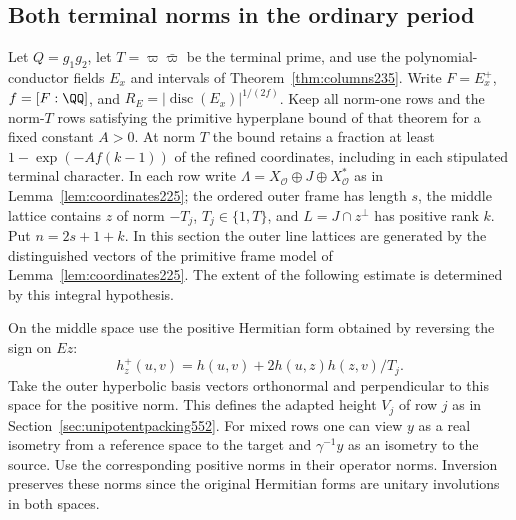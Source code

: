 \documentclass[a4paper,11pt]{article}
\theoremstyle{definition}
\theoremstyle{remark}
\numberwithin{equation}{section}
\begin{document}
\subsection{Both terminal norms in the ordinary period}
\label{sec:bothordinary553}

Let \(Q=g_1g_2\), let \(T=\varpi\bar\varpi\) be the terminal
prime, and use the polynomial-conductor fields \(E_x\) and
intervals of Theorem~\ref{thm:columns235}. Write \(F=E_x^+\),
\(f=[F:\QQ]\), and \(R_E=|\operatorname{disc}(E_x)|^{1/(2f)}\).
Keep all norm-one rows and the norm-\(T\) rows satisfying the
primitive hyperplane bound of that theorem for a fixed
constant \(A>0\). At norm \(T\) the bound retains a fraction
at least \(1-\exp(-Af(k-1))\) of the refined coordinates,
including in each stipulated terminal character. In each row
write \(\Lambda=X_{\mathcal O}\oplus J\oplus X_{\mathcal O}^*\)
as in Lemma~\ref{lem:coordinates225}; the ordered outer frame
has length \(s\), the middle lattice contains \(z\) of norm
\(-T_j\), \(T_j\in\{1,T\}\), and \(L=J\cap z^\perp\) has
positive rank \(k\). Put \(n=2s+1+k\). In this section the
outer line lattices are generated by the distinguished vectors
of the primitive frame model of Lemma~\ref{lem:coordinates225}.
The extent of the following estimate is determined by this
integral hypothesis.

On the middle space use the positive Hermitian form obtained by
reversing the sign on \(Ez\):
\[
        h_z^+(u,v)=h(u,v)+2h(u,z)h(z,v)/T_j .
\]
Take the outer hyperbolic basis vectors orthonormal and perpendicular
to this space for the positive norm. This defines the adapted
height \(V_j\) of row \(j\) as in Section~\ref{sec:unipotentpacking552}.
For mixed rows one can view \(y\) as a real isometry from a
reference space to the target and \(\gamma^{-1}y\) as an isometry
to the source. Use the corresponding positive norms in their
operator norms. Inversion preserves these norms since the
original Hermitian forms are unitary involutions in both spaces.
\end{document}
